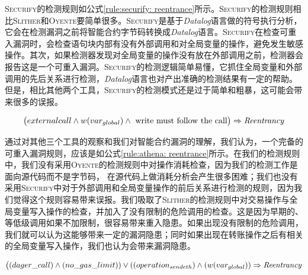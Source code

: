 \textsc{Securify}的检测规则如公式\ref{rule:securify: reentrance}所示。\textsc{Securify}的检测规则相比\textsc{Slither}和\textsc{Oyente}要简单很多。\textsc{Securify}是基于\emph{Datalog}语言做的符号执行分析，它会在检测漏洞之前将智能合约字节码转换成\emph{Datalog}语言。\textsc{Securify}在检查可重入漏洞时，会检查语句块内部有没有外部调用和对全局变量的操作，避免发生敏感操作。其次，如果检测器发现对全局变量的操作没有放在外部调用之前，检测器会报告这是一个可重入漏洞。\textsc{Securify}的检测逻辑简单易懂，它抓住全局变量和外部调用的先后关系进行检测，\emph{Datalog}语言也对产出准确的检测结果有一定的帮助。但是，相比其他两个工具，\textsc{Securify}的检测模式还是过于简单和粗暴，这可能会带来很多的误报。
\vspace{+3mm}
\begin{mdframed}[
	linewidth = 1pt,
	innertopmargin = -3pt,
	innerbottommargin = 3pt,
	outerlinewidth = 1pt
	]
    \small
	\begin{equation} \label{rule:securify: reentrance}
    \big ( externalcall \wedge w(var_{global}) \wedge \text{ write must follow the call} \big ) \Rightarrow \text{\emph{Reentrancy}}
	\end{equation}
\end{mdframed}
通过对其他三个工具的观察和我们对智能合约漏洞的理解，我们认为，一个完备的可重入漏洞规则，应该是如公式\ref{rule:athena: reentrance}所示。在我们的检测规则中，我们没有采用\textsc{Oyente}的检测规则中对操作消耗检查，因为我们的检测工作是面向源代码而不是字节码， 在源代码上做消耗分析会产生很多困难；我们也没有采用\textsc{Securify}中对于外部调用和全局变量操作的前后关系进行检测的规则，因为我们觉得这个规则容易带来误报。我们吸取了\textsc{Slither}的检测规则中对交易操作与全局变量写入操作的检查，并加入了没有限制的危险调用的检查。这是因为早期的、等低级调用如果不加限制，很容易带来重入隐患。如果出现没有限制的危险调用，我们就可以认为这能够带来一定的漏洞隐患；同时如果出现在转账操作之后有相关的全局变量写入操作，我们也认为会带来漏洞隐患。
\begin{mdframed}[
	linewidth = 1pt,
	innertopmargin = -10pt,
	innerbottommargin = 3pt,
	outerlinewidth = 1pt
	]
    \small
	\begin{equation} \label{rule:athena: reentrance}
    \big ((dager\_call) \wedge (no\_gas\_limit)) \vee ((operation_{sendeth}) \wedge (w(var_{global})) \Rightarrow \text{\emph{Reentrancy}}
	\end{equation}
\end{mdframed}

